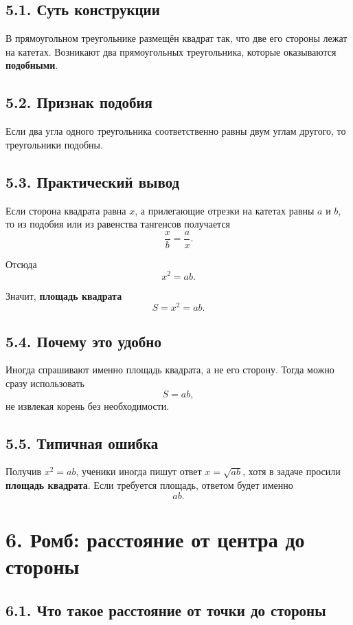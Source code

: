 \documentclass[a4paper,12pt]{article}
\begin{document}
\subsection*{5.1. Суть конструкции}

В прямоугольном треугольнике размещён квадрат так, что две его стороны лежат на катетах. Возникают два прямоугольных треугольника, которые оказываются \textbf{подобными}.

\subsection*{5.2. Признак подобия}

Если два угла одного треугольника соответственно равны двум углам другого, то треугольники подобны.

\subsection*{5.3. Практический вывод}

Если сторона квадрата равна $x$, а прилегающие отрезки на катетах равны $a$ и $b$, то из подобия или из равенства тангенсов получается
\[
\frac{x}{b}=\frac{a}{x}.
\]

Отсюда
\[
x^2=ab.
\]

Значит, \textbf{площадь квадрата}
\[
S=x^2=ab.
\]

\subsection*{5.4. Почему это удобно}

Иногда спрашивают именно площадь квадрата, а не его сторону. Тогда можно сразу использовать
\[
S=ab,
\]
не извлекая корень без необходимости.

\subsection*{5.5. Типичная ошибка}

Получив $x^2=ab$, ученики иногда пишут ответ $x=\sqrt{ab}$, хотя в задаче просили \textbf{площадь квадрата}.  
Если требуется площадь, ответом будет именно
\[
ab.
\]

\section*{6. Ромб: расстояние от центра до стороны}

\subsection*{6.1. Что такое расстояние от точки до стороны}
\end{document}
